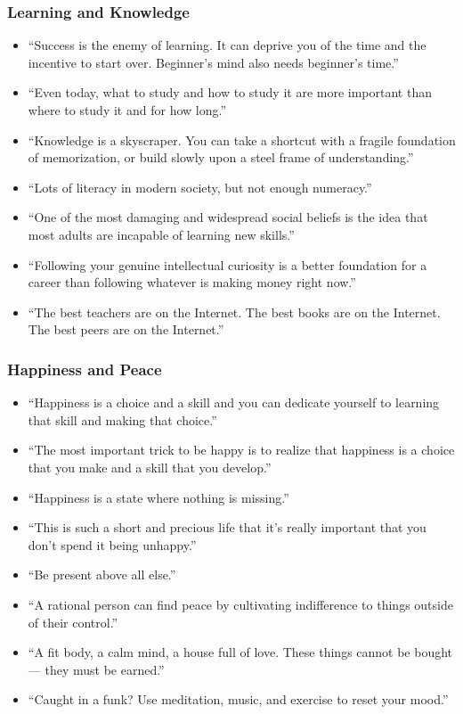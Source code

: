 \begin{frame}[fragile]\frametitle{Learning and Knowledge}
      \begin{itemize}
        \item “Success is the enemy of learning. It can deprive you of the time and the incentive to start over. Beginner’s mind also needs beginner’s time.”
        \item “Even today, what to study and how to study it are more important than where to study it and for how long.”
        \item “Knowledge is a skyscraper. You can take a shortcut with a fragile foundation of memorization, or build slowly upon a steel frame of understanding.”
        \item “Lots of literacy in modern society, but not enough numeracy.”
        \item “One of the most damaging and widespread social beliefs is the idea that most adults are incapable of learning new skills.”
        \item “Following your genuine intellectual curiosity is a better foundation for a career than following whatever is making money right now.”
        \item “The best teachers are on the Internet. The best books are on the Internet. The best peers are on the Internet.”
      \end{itemize}
\end{frame}
\begin{frame}[fragile]\frametitle{Happiness and Peace}
      \begin{itemize}
        \item “Happiness is a choice and a skill and you can dedicate yourself to learning that skill and making that choice.”
        \item “The most important trick to be happy is to realize that happiness is a choice that you make and a skill that you develop.”
        \item “Happiness is a state where nothing is missing.”
        \item “This is such a short and precious life that it’s really important that you don’t spend it being unhappy.”
        \item “Be present above all else.”
        \item “A rational person can find peace by cultivating indifference to things outside of their control.”
        \item “A fit body, a calm mind, a house full of love. These things cannot be bought — they must be earned.”
        \item “Caught in a funk? Use meditation, music, and exercise to reset your mood.”
      \end{itemize}
\end{frame}

